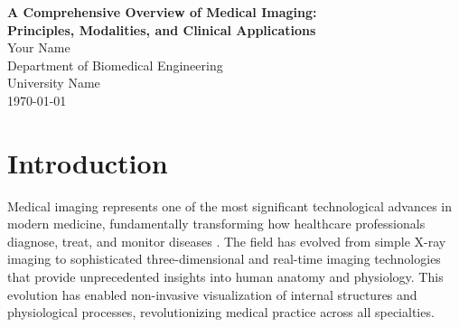 \documentclass[12pt]{article}
\begin{document}
\begin{titlepage}
\begin{center}
\vspace*{2cm}
{\LARGE\bfseries A Comprehensive Overview of Medical Imaging:\\[0.5cm] 
Principles, Modalities, and Clinical Applications}\\[2cm]

{\large Your Name}\\[1cm]
Department of Biomedical Engineering\\
University Name\\[1cm]

\vfill
{\large \today}
\end{center}
\end{titlepage}

\begin{abstract}
This comprehensive review explores the fundamental principles and clinical applications of modern medical imaging technologies \citep{mehndiratta2014,kanabolo2019}. The article examines the physical foundations of various imaging modalities, including X-ray computed tomography (CT), magnetic resonance imaging (MRI), ultrasound, and nuclear medicine techniques. We discuss how these technologies leverage different forms of energy-matter interactions to visualize internal body structures and physiological processes. The review also analyzes the specific clinical applications of each modality across various medical specialties, highlighting their roles in diagnosis, treatment planning, and disease monitoring \citep{goh2024}. This work provides healthcare professionals and researchers with a thorough understanding of current medical imaging capabilities and their impact on patient care.
\end{abstract}

\newpage
\tableofcontents
\newpage

\section{Introduction}
Medical imaging represents one of the most significant technological advances in modern medicine, fundamentally transforming how healthcare professionals diagnose, treat, and monitor diseases \citep{kaur2024}. The field has evolved from simple X-ray imaging to sophisticated three-dimensional and real-time imaging technologies that provide unprecedented insights into human anatomy and physiology. This evolution has enabled non-invasive visualization of internal structures and physiological processes, revolutionizing medical practice across all specialties.
\end{document}
